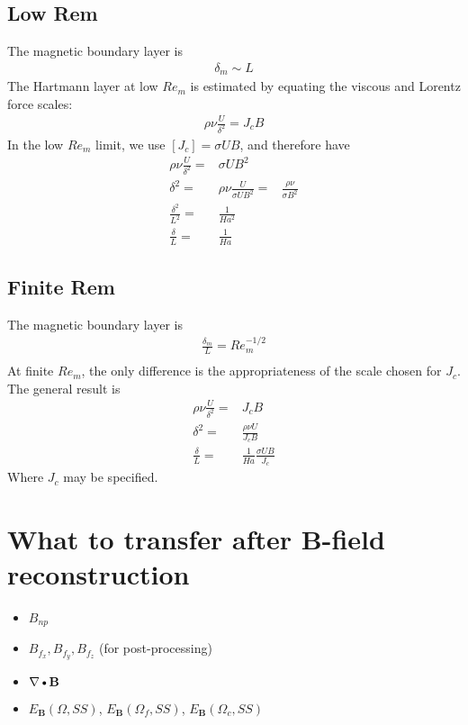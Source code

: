 \documentclass[11pt]{article}
\newcommand{\B}{\mathbf{B}}
\newcommand{\DOT}{\text{\textbullet}}
\newcommand{\DEL}{\nabla}
\begin{document}
\subsection{Low Rem}
The magnetic boundary layer is 
\begin{equation}\begin{aligned}
	\delta_m \sim L
\end{aligned}\end{equation}
The Hartmann layer at low $Re_m$ is estimated by equating the viscous and Lorentz force scales:
\begin{equation}\begin{aligned}
	\rho \nu \frac{U}{\delta^2} = J_c B
\end{aligned}\end{equation}
In the low $Re_m$ limit, we use $[J_c] = \sigma U B$, and therefore have
\begin{equation}\begin{aligned}
	\rho \nu \frac{U}{\delta^2} =& \sigma U B^2 \\
	\delta^2 =& \rho \nu \frac{U}{\sigma U B^2} 
	         = & \frac{\rho \nu}{\sigma B^2} \\
	\frac{\delta^2}{L^2} =& \frac{1}{Ha^2} \\
	\frac{\delta}{L} =& \frac{1}{Ha}
\end{aligned}\end{equation}

\subsection{Finite Rem}
The magnetic boundary layer is 
\begin{equation}\begin{aligned}
	\frac{\delta_m}{L} = Re_m^{-1/2} \\
\end{aligned}\end{equation}
At finite $Re_m$, the only difference is the appropriateness of the scale chosen for $J_c$. The general result is
\begin{equation}\begin{aligned}
	\rho \nu \frac{U}{\delta^2} =& J_c B \\
	\delta^2 =& \frac{\rho \nu U}{J_c B} \\
	\frac{\delta}{L} =& \frac{1}{Ha} \frac{\sigma U B}{J_c}
\end{aligned}\end{equation}
Where $J_c$ may be specified.

\section{What to transfer after B-field reconstruction}
\begin{itemize}
\item $B_{np}$
\item $B_{f_x},B_{f_y},B_{f_z}$ (for post-processing)
\item $\DEL \DOT \B$
\item $E_{\B}(\Omega,SS)$, $E_{\B}(\Omega_f,SS)$, $E_{\B}(\Omega_c,SS)$
\end{itemize}
\end{document}
